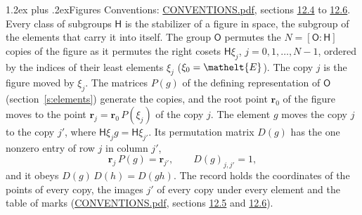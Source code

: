 \documentclass[10pt,a4paper]{article}
\makeatletter
\renewcommand\section{\@startsection{section}{1}{\z@}{-3ex plus -1ex minus -.2ex}%
  {1.2ex plus .2ex}{\normalfont\large\sffamily\bfseries\color{parttitle}}}
\numberwithin{equation}{section}
\newcommand{\eltfont}[1]{{\let\sigma\eltsigma\mathelt{#1}}}
\newcommand{\grp}[1]{\mathsf{#1}}
\newcommand{\cls}[1]{\eltfont{#1}}
\newcommand{\pointr}{\mathbf{r}}
\makeatother
\begin{document}
\section{Figures}\label{s:permutation}
Conventions: \href{../../CONVENTIONS.pdf}{CONVENTIONS.pdf}, sections \href{../../CONVENTIONS.pdf\#conv.12.4}{12.4} to \href{../../CONVENTIONS.pdf\#conv.12.6}{12.6}.
Every class of subgroups $\grp{H}$ is the stabilizer of a figure in space, the subgroup of the elements that carry it into itself. \label{n:local.orbit.size}The group $\grp{O}$ permutes the $N = [\grp{O} : \grp{H}]$ copies of the figure as it permutes the right cosets $\grp{H}\xi_j$, $j = 0, 1, \dots, N - 1$, ordered by the indices of their least elements $\xi_j$ ($\xi_0 = \cls{E}$). The copy $j$ is the figure moved by $\xi_j$. The matrices $P(g)$ of the defining representation of $\grp{O}$ (section~\ref{s:elements}) generate the copies, and the root point $\pointr_0$ of the figure moves to the point $\pointr_j = \pointr_0\, P(\xi_j)$ of the copy $j$. The element $g$ moves the copy $j$ to the copy $j'$, where $\grp{H}\xi_j g = \grp{H}\xi_{j'}$. \label{n:local.matrix.permutation}Its permutation matrix $D(g)$ has the one nonzero entry of row $j$ in column $j'$,
\begin{equation}\label{e:perm.matrix}\pointr_j\, P(g) = \pointr_{j'}, \qquad D(g)_{j,j'} = 1,\end{equation}
and it obeys $D(g)\, D(h) = D(gh)$. The record holds the coordinates of the points of every copy, the images $j'$ of every copy under every element and the table of marks (\href{../../CONVENTIONS.pdf}{CONVENTIONS.pdf}, sections \href{../../CONVENTIONS.pdf\#conv.12.5}{12.5} and \href{../../CONVENTIONS.pdf\#conv.12.6}{12.6}).
\end{document}
